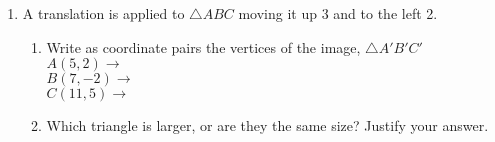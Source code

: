 \documentclass[12pt, twoside]{article}
\begin{document}
\begin{enumerate}[itemsep=0.5cm]
\item A translation is applied to $\triangle ABC$ moving it up 3 and to the left 2.
\begin{enumerate}
  \item Write as coordinate pairs the vertices of the image, $\triangle A'B'C'$ \\[0.7cm]
  $A(5,2) \rightarrow$ \\[0.7cm]
  $B(7,-2) \rightarrow$ \\[0.7cm]
  $C(11,5) \rightarrow$ \\[0.2cm]
  \item Which triangle is larger, or are they the same size? Justify your answer.
\end{enumerate}



\end{enumerate}
\end{document}
